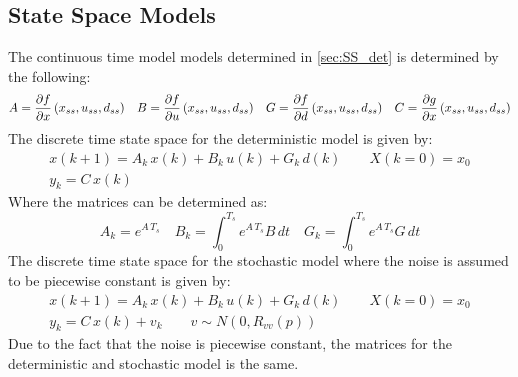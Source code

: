 \subsection{State Space Models}
The continuous time model models determined in \cref{sec:SS_det} is determined by the following:
\begin{equation}
    A=\pdv{f}{x}\,(x_{ss},u_{ss},d_{ss}) \quad
    B=\pdv{f}{u}\,(x_{ss},u_{ss},d_{ss}) \quad
    G=\pdv{f}{d}\,(x_{ss},u_{ss},d_{ss}) \quad
    C=\pdv{g}{x}\,(x_{ss},u_{ss},d_{ss})
\end{equation}
The discrete time state space for the deterministic model is given by:
\begin{equation}
    \begin{matrix}
        x(k+1)=A_k\,x(k)+B_k\,u(k)+G_k\,d(k) \qquad X(k=0)=x_0\\
        y_k=C\,x(k)
    \end{matrix}
\end{equation}
Where the matrices can be determined as:
\begin{equation}
   A_k=e^{A\,T_s} \quad B_k=\int_0^{T_s}e^{A\,T_s}B\,dt \quad G_k=\int_0^{T_s}e^{A\,T_s}G\,dt 
\end{equation}
The discrete time state space for the stochastic model where the noise is assumed to be piecewise constant is given by:
\begin{equation}
    \begin{gathered}
        x(k+1)=A_k\,x(k)+B_k\,u(k)+G_k\,d(k) \qquad X(k=0)=x_0\\
        y_k=C\,x(k)+v_k \qquad v\sim N(0,R_{vv}(p))
    \end{gathered}
\end{equation}
Due to the fact that the noise is piecewise constant, the matrices for the deterministic and stochastic model is the same.\\
